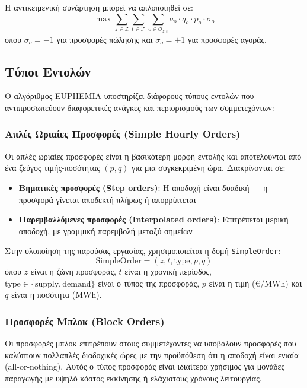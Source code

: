 Η αντικειμενική συνάρτηση μπορεί να απλοποιηθεί σε:
\begin{equation}
\label{eq:euphemia-objective-simplified}
\max \sum_{z \in \mathcal{Z}} \sum_{t \in \mathcal{T}} \sum_{o \in \mathcal{O}_{z,t}} a_o \cdot q_o \cdot p_o \cdot \sigma_o
\end{equation}
όπου $\sigma_o = -1$ για προσφορές πώλησης και $\sigma_o = +1$ για προσφορές αγοράς.

\subsection{Τύποι Εντολών}
\label{subsec:euphemia-order-types}

Ο αλγόριθμος EUPHEMIA υποστηρίζει διάφορους τύπους εντολών που αντιπροσωπεύουν διαφορετικές ανάγκες και περιορισμούς των συμμετεχόντων:

\subsubsection{Απλές Ωριαίες Προσφορές (Simple Hourly Orders)}

Οι απλές ωριαίες προσφορές είναι η βασικότερη μορφή εντολής και αποτελούνται από ένα ζεύγος τιμής-ποσότητας $(p, q)$ για μια συγκεκριμένη ώρα. Διακρίνονται σε:
\begin{itemize}
    \item \textbf{Βηματικές προσφορές (Step orders)}: Η αποδοχή είναι δυαδική --- η προσφορά γίνεται αποδεκτή πλήρως ή απορρίπτεται
    \item \textbf{Παρεμβαλλόμενες προσφορές (Interpolated orders)}: Επιτρέπεται μερική αποδοχή, με γραμμική παρεμβολή μεταξύ σημείων
\end{itemize}

Στην υλοποίηση της παρούσας εργασίας, χρησιμοποιείται η δομή \texttt{SimpleOrder}:
\begin{equation}
\label{eq:simple-order}
\text{SimpleOrder} = (z, t, \text{type}, p, q)
\end{equation}
όπου $z$ είναι η ζώνη προσφοράς, $t$ είναι η χρονική περίοδος, $\text{type} \in \{\text{supply}, \text{demand}\}$ είναι ο τύπος της προσφοράς, $p$ είναι η τιμή (€/MWh) και $q$ είναι η ποσότητα (MWh).

\subsubsection{Προσφορές Μπλοκ (Block Orders)}

Οι προσφορές μπλοκ επιτρέπουν στους συμμετέχοντες να υποβάλουν προσφορές που καλύπτουν πολλαπλές διαδοχικές ώρες με την προϋπόθεση ότι η αποδοχή είναι ενιαία (all-or-nothing). Αυτός ο τύπος προσφοράς είναι ιδιαίτερα χρήσιμος για μονάδες παραγωγής με υψηλό κόστος εκκίνησης ή ελάχιστους χρόνους λειτουργίας.

